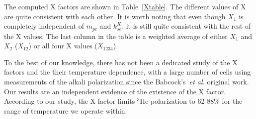 The computed X factors are shown in Table~\ref{Xtable}. The different values of X are quite consistent with each other. It is worth noting that even though $X_1$ is completely independent of $m_{pc}$ and $k_{se}^K$, it is still quite consistent with the rest of the X values. The last column in the table is a weighted average of either $X_1$ and $X_2$ ($X_{12}$) or all four X values ($X_{1234}$). 

To the best of our knowledge, there has not been a dedicated study of the X factors and the their temperature dependence, with a large number of cells using measurements of the alkali polarization since the Babcock's~\emph{et al.} original work. Our results are an independent evidence of the existence of the X factor. According to our study, the X factor limits $^3$He polarization to 62-88\% for the range of temperature we operate within.

















